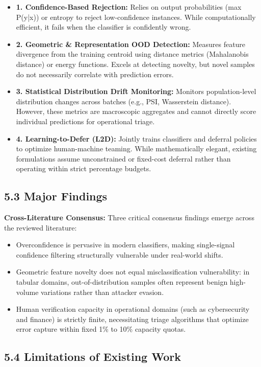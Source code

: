 \begin{itemize}
\item \textbf{1. Confidence-Based Rejection:} Relies on output probabilities (max P(y|x)) or entropy to reject low-confidence instances. While computationally efficient, it fails when the classifier is confidently wrong.
\item \textbf{2. Geometric \& Representation OOD Detection:} Measures feature divergence from the training centroid using distance metrics (Mahalanobis distance) or energy functions. Excels at detecting novelty, but novel samples do not necessarily correlate with prediction errors.
\item \textbf{3. Statistical Distribution Drift Monitoring:} Monitors population-level distribution changes across batches (e.g., PSI, Wasserstein distance). However, these metrics are macroscopic aggregates and cannot directly score individual predictions for operational triage.
\item \textbf{4. Learning-to-Defer (L2D):} Jointly trains classifiers and deferral policies to optimize human-machine teaming. While mathematically elegant, existing formulations assume unconstrained or fixed-cost deferral rather than operating within strict percentage budgets.
\end{itemize}

\subsection{5.3 Major Findings}

\textbf{Cross-Literature Consensus:} Three critical consensus findings emerge across the reviewed literature:

\begin{itemize}
\item Overconfidence is pervasive in modern classifiers, making single-signal confidence filtering structurally vulnerable under real-world shifts.
\item Geometric feature novelty does not equal misclassification vulnerability: in tabular domains, out-of-distribution samples often represent benign high-volume variations rather than attacker evasion.
\item Human verification capacity in operational domains (such as cybersecurity and finance) is strictly finite, necessitating triage algorithms that optimize error capture within fixed 1\% to 10\% capacity quotas.
\end{itemize}

\subsection{5.4 Limitations of Existing Work}

